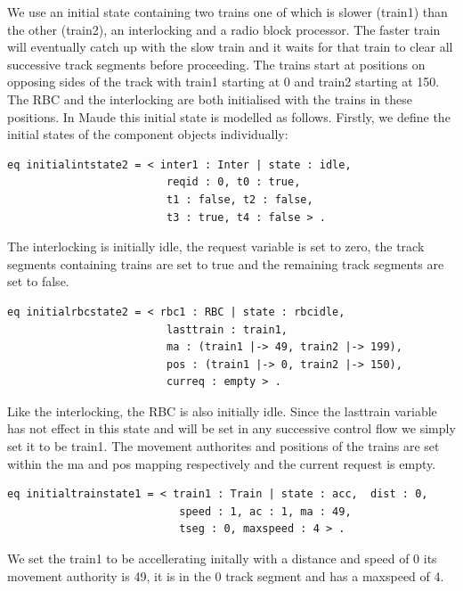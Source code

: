 We use an initial state containing two trains one of which is slower (train1) than the other (train2), an interlocking and a radio block processor. The faster train will eventually catch up with the slow train and it waits for that train to clear all successive track segments before proceeding. The trains start at positions on opposing sides of the track with train1 starting at 0 and train2 starting at 150. The RBC and the interlocking are both initialised with the trains in these positions. In Maude this initial state is modelled as follows. Firstly, we define the initial states of the component objects individually:

\begin{lstlisting}[caption = The initial interlocking state in Maude]
 eq initialintstate2 = < inter1 : Inter | state : idle, 
                         reqid : 0, t0 : true, 
                         t1 : false, t2 : false, 
                         t3 : true, t4 : false > .
\end{lstlisting}

The  interlocking is initially idle, the request variable is set to zero, the track segments containing trains are set to true and the remaining track segments are set to false.

\begin{lstlisting}[caption = The initial RBC state in Maude]
 eq initialrbcstate2 = < rbc1 : RBC | state : rbcidle, 
                         lasttrain : train1,  
                         ma : (train1 |-> 49, train2 |-> 199), 
                         pos : (train1 |-> 0, train2 |-> 150), 
                         curreq : empty > .
\end{lstlisting}

Like the interlocking, the RBC is also initially idle. Since the lasttrain variable has not effect in this state and will be set in any successive control flow we simply set it to be train1. The movement authorites  and positions of the trains are set within the ma and pos mapping respectively and the current request is empty.  

\begin{lstlisting}[caption = The intital state of train1 in Maude]
 eq initialtrainstate1 = < train1 : Train | state : acc,  dist : 0, 
                           speed : 1, ac : 1, ma : 49, 
                           tseg : 0, maxspeed : 4 > .
\end{lstlisting}
We set the train1 to be accellerating initally with a distance and speed of 0 its movement authority is 49, it is in the 0 track segment and has a maxspeed of 4. 

